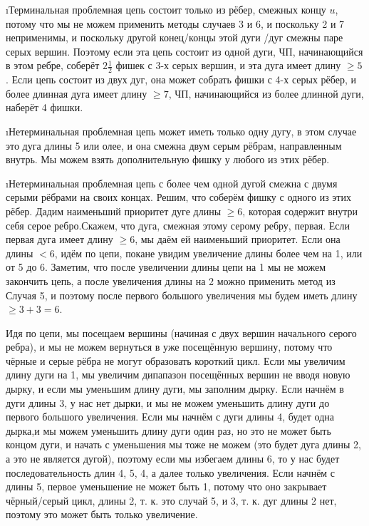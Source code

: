 \begin{proofstar}
\begin{enumerate}
\i Терминальная проблемная цепь состоит только из рёбер, смежных концу $u$, потому что мы не можем применить методы случаев 3 и 6, и поскольку 2 и 7 неприменимы, и поскольку другой конец/концы этой дуги /дуг смежны паре серых вершин. Поэтому если эта цепь состоит из одной дуги, ЧП, начинающийся в этом ребре, соберёт $2\frac{1}{2}$ фишек с 3-х серых вершин, и эта дуга имеет длину $\ge 5$. Если цепь состоит из двух дуг, она может собрать фишки с 4-х серых рёбер, и более длинная дуга имеет длину $\ge 7$, ЧП, начинающийся из более длинной дуги, наберёт 4 фишки.

\i Нетерминальная проблемная цепь может иметь только одну дугу, в этом случае это дуга длины 5 или олее, и она смежна двум серым рёбрам, направленным внутрь. Мы можем взять дополнительную фишку у любого из этих рёбер.

\i Нетерминальная проблемная цепь с более чем одной дугой смежна с двумя серыми рёбрами на своих концах. Решим, что соберём фишку с одного из этих рёбер. Дадим наименьший приоритет дуге длины $\ge 6$, которая содержит внутри себя серое ребро.Скажем, что дуга, смежная этому серому ребру, первая. Если первая дуга имеет длину $\ge 6$, мы даём ей наименьший приоритет. Если она длины $< 6$, идём по цепи, покане увидим увеличение длины более чем на 1, или от 5 до 6. Заметим, что после увеличении длины цепи на 1 мы не можем закончить цепь, а после увеличения длины на 2 можно применить метод из Случая 5, и поэтому после первого большого увеличения мы будем иметь длину $\ge 3+3=6$. 
\end{enumerate}

Идя по цепи, мы посещаем вершины (начиная с двух вершин начального серого ребра), и мы не можем вернуться в уже посещённую вершину, потому что чёрные и серые рёбра не могут образовать короткий цикл. Если мы увеличим длину дуги на 1, мы увеличим дипапазон посещённых вершин не вводя новую дырку, и если мы уменьшим длину дуги, мы заполним дырку. Если начнём в дуги длины 3, у нас нет дырки, и мы не можем уменьшить длину дуги до первого большого увеличения. Если мы начнём с дуги длины 4, будет одна дырка,и мы можем уменьшить длину дуги один раз, но это не может быть концом дуги, и начать с уменьшения мы тоже не можем (это будет дуга длины 2, а это не является дугой), поэтому если мы избегаем длины 6, то у нас будет последовательность длин 4, 5, 4, а далее только увеличения. Если начнём с длины 5, первое уменьшение не может быть 1, потому что оно закрывает чёрный/серый цикл, длины 2, т. к. это случай 5, и 3, т. к. дуг длины 2 нет, поэтому это может быть только увеличение.


\end{proofstar}
